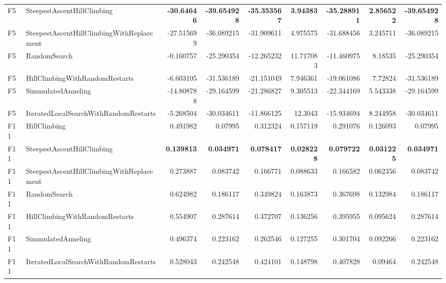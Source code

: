 \begin{tabular}{llrrrrrrr}
F5 & SteepestAscentHillClimbing & \textbf{-30.64646} & \textbf{-39.654928} & \textbf{-35.353567} & \textbf{3.94383} & \textbf{-35.288911} & \textbf{2.856522} & \textbf{-39.654928} \\ 
F5 & SteepestAscentHillClimbingWithReplacement & -27.515699 & -36.089215 & -31.909611 & 4.975575 & -31.688456 & 3.245711 & -36.089215 \\ 
F5 & RandomSearch & -0.160757 & -25.290354 & -12.265232 & 11.717083 & -11.460975 & 8.18535 & -25.290354 \\ 
F5 & HillClimbingWithRandomRestarts & -6.603105 & -31.536189 & -21.151049 & 7.946361 & -19.061086 & 7.72824 & -31.536189 \\ 
F5 & SimmulatedAnneling & -14.808788 & -29.164599 & -21.286827 & 9.305513 & -22.344169 & 5.543338 & -29.164599 \\ 
F5 & IteratedLocalSearchWithRandomRestarts & -5.268504 & -30.034611 & -11.866125 & 12.3043 & -15.934694 & 8.244958 & -30.034611 \\ 
F11 & HillClimbing & 0.491982 & 0.07995 & 0.312324 & 0.157119 & 0.291076 & 0.126093 & 0.07995 \\ 
F11 & SteepestAscentHillClimbing & \textbf{0.139813} & \textbf{0.034971} & \textbf{0.078417} & \textbf{0.028228} & \textbf{0.079722} & \textbf{0.031225} & \textbf{0.034971} \\ 
F11 & SteepestAscentHillClimbingWithReplacement & 0.273887 & 0.083742 & 0.166771 & 0.088633 & 0.166582 & 0.062356 & 0.083742 \\ 
F11 & RandomSearch & 0.624982 & 0.186117 & 0.349824 & 0.163873 & 0.367698 & 0.132984 & 0.186117 \\ 
F11 & HillClimbingWithRandomRestarts & 0.554907 & 0.287614 & 0.372707 & 0.136256 & 0.395955 & 0.095624 & 0.287614 \\ 
F11 & SimmulatedAnneling & 0.496374 & 0.223162 & 0.262546 & 0.127255 & 0.301704 & 0.092266 & 0.223162 \\ 
F11 & IteratedLocalSearchWithRandomRestarts & 0.528043 & 0.242548 & 0.424101 & 0.148798 & 0.407828 & 0.09464 & 0.242548 \\ 
\bottomrule
\end{tabular}
